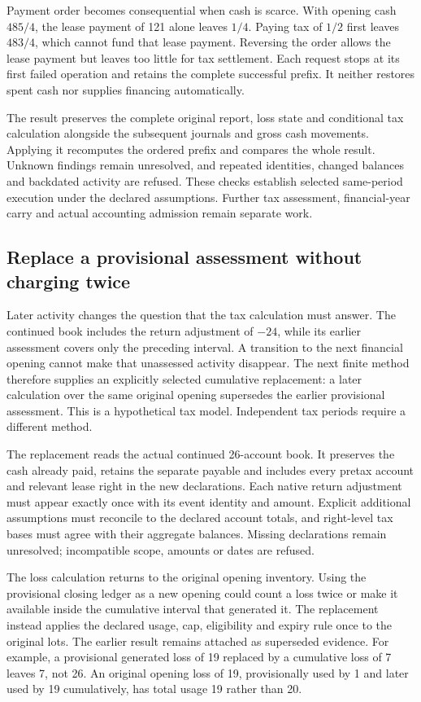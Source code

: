Payment order becomes consequential when cash is scarce. With opening cash
$485/4$, the lease payment of 121 alone leaves $1/4$. Paying tax of $1/2$
first leaves $483/4$, which cannot fund that lease payment. Reversing the order
allows the lease payment but leaves too little for tax settlement. Each request
stops at its first failed operation and retains the complete successful prefix.
It neither restores spent cash nor supplies financing automatically.

The result preserves the complete original report, loss state and conditional
tax calculation alongside the subsequent journals and gross cash movements.
Applying it recomputes the ordered prefix and compares the whole result.
Unknown findings remain unresolved, and repeated identities, changed balances
and backdated activity are refused. These checks establish selected same-period
execution under the declared assumptions. Further tax assessment, financial-year
carry and actual accounting admission remain separate work.

\subsection{Replace a provisional assessment without charging twice}

Later activity changes the question that the tax calculation must answer.
The continued book includes the return adjustment of $-24$, while its earlier
assessment covers only the preceding interval. A transition to the next
financial opening cannot make that unassessed activity disappear. The next
finite method therefore supplies an explicitly selected cumulative replacement:
a later calculation over the same original opening supersedes the earlier
provisional assessment. This is a hypothetical tax model. Independent tax
periods require a different method.

The replacement reads the actual continued 26-account book. It preserves the
cash already paid, retains the separate payable and includes every pretax
account and relevant lease right in the new declarations. Each native return
adjustment must appear exactly once with its event identity and amount.
Explicit additional assumptions must reconcile to the declared account totals,
and right-level tax bases must agree with their aggregate balances. Missing
declarations remain unresolved; incompatible scope, amounts or dates are refused.

The loss calculation returns to the original opening inventory. Using the
provisional closing ledger as a new opening could count a loss twice or make
it available inside the cumulative interval that generated it. The replacement
instead applies the declared usage, cap, eligibility and expiry rule once to
the original lots. The earlier result remains attached as superseded evidence.
For example, a provisional generated loss of 19 replaced by a cumulative loss
of 7 leaves 7, not 26. An original opening loss of 19, provisionally used by 1
and later used by 19 cumulatively, has total usage 19 rather than 20.

